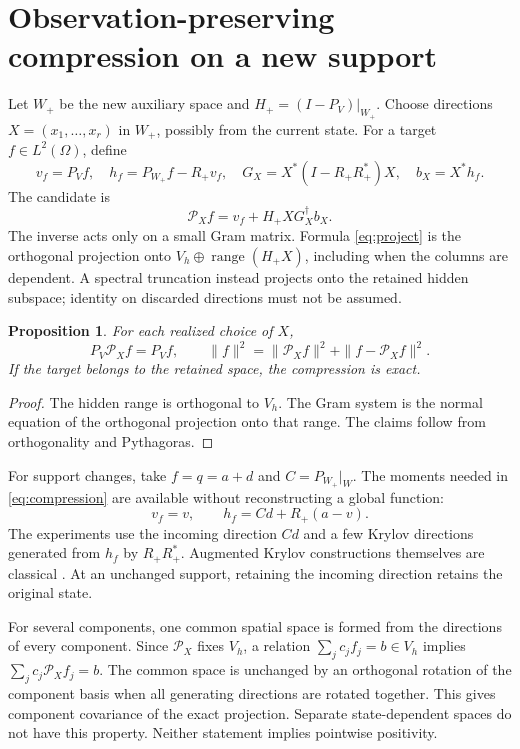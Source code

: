 \documentclass[10pt,a4paper]{article}
\newtheorem{proposition}{Proposition}
\newcommand{\V}{V_h}
\newcommand{\PV}{P_V}
\begin{document}
\section{Observation-preserving compression on a new support}
Let $W_+$ be the new auxiliary space and $H_+=(I-\PV)|_{W_+}$.
Choose directions $X=(x_1,\ldots,x_r)$ in $W_+$, possibly from the
current state. For a target $f\in L^2(\Omega)$, define
\begin{equation}\label{eq:compression}
 v_f=\PV f,\quad h_f=P_{W_+}f-R_+v_f,\quad
 G_X=X^*(I-R_+R_+^*)X,\quad b_X=X^*h_f.
\end{equation}
The candidate is
\begin{equation}\label{eq:project}
 \mathcal P_X f=v_f+H_+XG_X^\dagger b_X.
\end{equation}
The inverse acts only on a small Gram matrix. Formula
\eqref{eq:project} is the orthogonal projection onto
$\V\oplus\operatorname{range}(H_+X)$, including when the columns
are dependent. A spectral truncation instead projects onto the retained
hidden subspace; identity on discarded directions must not be assumed.

\begin{proposition}
For each realized choice of $X$,
\[
 \PV\mathcal P_X f=\PV f,\qquad
 \|f\|^2=\|\mathcal P_Xf\|^2+\|f-\mathcal P_Xf\|^2.
\]
If the target belongs to the retained space, the compression is exact.
\end{proposition}
\begin{proof}
The hidden range is orthogonal to $\V$. The Gram system is the normal
equation of the orthogonal projection onto that range. The claims follow
from orthogonality and Pythagoras.
\end{proof}

For support changes, take $f=q=a+d$ and $C=P_{W_+}|_W$. The moments
needed in \eqref{eq:compression} are available without reconstructing
a global function:
\[
 v_f=v,\qquad h_f=Cd+R_+(a-v).
\]
The experiments use the incoming direction $Cd$ and a few Krylov
directions generated from $h_f$ by $R_+R_+^*$. Augmented Krylov
constructions themselves are classical \cite{gaul}. At an unchanged
support, retaining the incoming direction retains the original state.

For several components, one common spatial space is formed from the
directions of every component. Since $\mathcal P_X$ fixes $\V$, a
relation $\sum_j c_j f_j=b\in\V$ implies
$\sum_j c_j\mathcal P_Xf_j=b$. The common space is unchanged by an
orthogonal rotation of the component basis when all generating
directions are rotated together. This gives component covariance of
the exact projection. Separate state-dependent spaces do not have
this property. Neither statement implies pointwise positivity.
\end{document}
